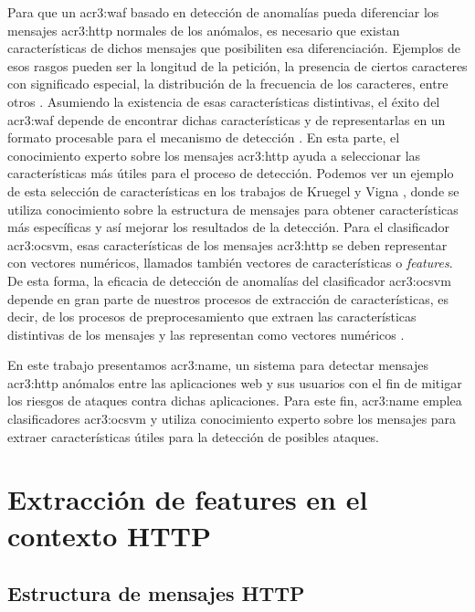 Para que un \gls{acr3:waf} basado en detección de anomalías pueda diferenciar
los mensajes \gls{acr3:http} normales de los anómalos, es necesario que
existan características de dichos mensajes que posibiliten esa diferenciación.
Ejemplos de esos rasgos pueden ser la longitud de la petición, la presencia
de ciertos caracteres con significado especial, la distribución de la
frecuencia de los caracteres, entre otros
\cite{kruegel2003anomaly}. %
Asumiendo la existencia de esas características distintivas, el éxito
del \gls{acr3:waf} depende de encontrar dichas características y de
representarlas en un formato procesable para el mecanismo de detección
\cite{torranoGimenez2015study}. %
En esta parte, el conocimiento experto sobre los mensajes \gls{acr3:http}
ayuda a seleccionar las características más útiles para el proceso de
detección. Podemos ver un ejemplo de esta selección de características
en los trabajos de Kruegel y Vigna \cite{kruegel2003anomaly} \cite{kruegel2005multi},
donde se utiliza conocimiento sobre la estructura de mensajes para obtener
características más específicas y así mejorar los resultados de la
detección.
Para el clasificador \gls{acr3:ocsvm}, esas características de los mensajes
\gls{acr3:http} se deben representar con vectores numéricos, llamados
también vectores de características o \textit{features}.
De esta forma, la eficacia de detección de anomalías del clasificador
\gls{acr3:ocsvm} depende en gran parte de nuestros procesos de extracción
de características, es decir, de los procesos de preprocesamiento que
extraen las características distintivas de los mensajes y las representan
como vectores numéricos
\cite{torranoGimenez2015study}. %

En este trabajo presentamos \gls{acr3:name}, un sistema para
detectar mensajes \gls{acr3:http} anómalos entre las aplicaciones web
y sus usuarios con el fin de mitigar los riesgos de ataques contra dichas
aplicaciones.
Para este fin, \gls{acr3:name} emplea clasificadores \gls{acr3:ocsvm} y
utiliza conocimiento experto sobre los mensajes para extraer características
útiles para la detección de posibles ataques.


\section{Extracción de features en el contexto HTTP}
\label{chap:p3_concepts_features}


\subsection{Estructura de mensajes HTTP}

